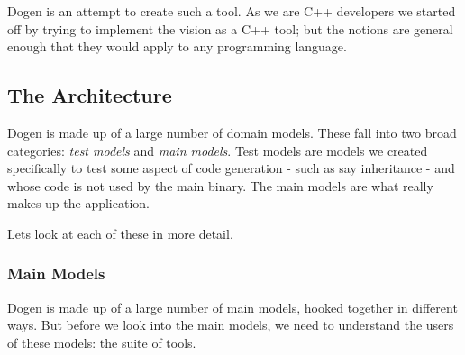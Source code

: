 \documentclass[11pt]{article}
\begin{document}
Dogen is an attempt to create such a tool. As we are C++ developers we
started off by trying to implement the vision as a C++ tool; but the
notions are general enough that they would apply to any programming
language.

\subsection{The Architecture}
\label{sec-2-2}

Dogen is made up of a large number of domain models. These fall into
two broad categories: \emph{test models} and \emph{main models}. Test models are
models we created specifically to test some aspect of code
generation - such as say inheritance - and whose code is not used by
the main binary. The main models are what really makes up the
application.

Lets look at each of these in more detail.

\subsubsection{Main Models}
\label{sec-2-2-1}

Dogen is made up of a large number of main models, hooked together in
different ways. But before we look into the main models, we need to
understand the users of these models: the suite of tools.
\end{document}
